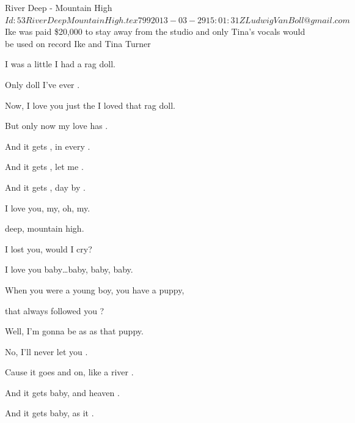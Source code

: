 \begin{SBSong}{River Deep - Mountain High}
  {$Id: 53RiverDeepMountainHigh.tex 799 2013-03-29 15:01:31Z LudwigVanBoll@gmail.com $}
  {Ike was paid \$20,000 to stay away from the studio and only Tina's vocals would be used on record}
  {Ike and Tina Turner}
  \begin{SBVerse}
     I was a little  I had a rag doll.

    Only doll I've ever .

    Now, I love you just the  I loved that rag doll.

    But only now my love has .

    And it gets , in every .

    And it gets , let me .
    
    And it gets , day by .
  \end{SBVerse}
  \begin{SBChorus}
     I love you, my, oh, my.

     deep, mountain high.

     I lost you, would I cry?

     I love you baby\ldots baby, baby, baby. 
  \end{SBChorus}
  \begin{SBVerse}
    When you were a young boy,  you have a puppy,

    that always followed you ?

    Well, I'm gonna be as  as that puppy.

    No, I'll never let you .

    Cause it goes  and on, like a river .

    And it gets  baby, and heaven .

    And it gets  baby, as it .
  \end{SBVerse}
\end{SBSong}